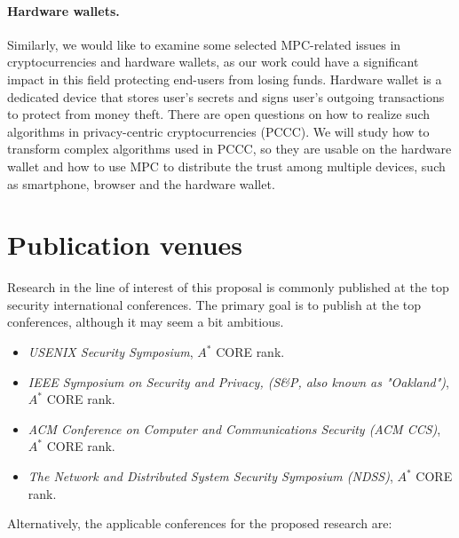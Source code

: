 \documentclass[
  digital, %
  twoside, %
  table,   %
  lof,     %
  lot,     %
]{fithesis3}
\newcounter{ph4_show_guides}
\theoremstyle{definition}
\theoremstyle{remark}
\begin{document}
\paragraph{Hardware wallets.}%
Similarly, we would like to examine some selected MPC-related issues in cryptocurrencies and hardware wallets, as our work could have a significant impact in this field protecting end-users from losing funds. 
Hardware wallet is a dedicated device that stores user's secrets and signs user's outgoing transactions to protect from money theft. There are open questions on how to realize such algorithms in privacy-centric cryptocurrencies (PCCC).
We will study how to transform complex algorithms used in PCCC, so they are usable on the hardware wallet and how to use MPC to distribute the trust among multiple devices, such as smartphone, browser and the hardware wallet. 


\section{Publication venues}
Research in the line of interest of this proposal is commonly published at the top security international conferences. The primary goal is to publish at the top conferences, although it may seem a bit ambitious.

\begin{itemize}
	\item \emph{USENIX Security Symposium}, $A^*$ CORE rank.
	
	\item \emph{IEEE Symposium on Security and Privacy, (S\&P, also known as "Oakland")}, $A^*$ CORE rank.
	
	\item \emph{ACM Conference on Computer and Communications Security (ACM CCS)}, $A^*$ CORE rank.
	
	\item \emph{The Network and Distributed System Security Symposium (NDSS)}, $A^*$ CORE rank.
\end{itemize}

Alternatively, the applicable conferences for the proposed research are:
\end{document}
